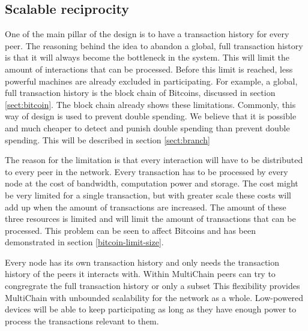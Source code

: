 \subsection{Scalable reciprocity}
\label{sect:scalable-reciprocity}
One of the main pillar of the design is to have a transaction history for every peer.
The reasoning behind the idea to abandon a global, full transaction history
is that it will always become the bottleneck in the system.
This will limit the amount of interactions that can be processed.
Before this limit is reached, less powerful machines are already excluded in participating.
For example, a global, full transaction history is the block chain of Bitcoins, discussed in section \ref{sect:bitcoin}.
The block chain already shows these limitations.
Commonly, this way of design is used to prevent double spending.
We believe that it is possible and much cheaper to detect and punish double spending than prevent double spending.
This will be described in section \ref{sect:branch}

The reason for the limitation is that every interaction will have to be distributed to every peer in the network.
Every transaction has to be processed by every node at the cost of bandwidth, computation power and storage.
The cost might be very limited for a single transaction,
but with greater scale these costs will add up when the amount of transactions are increased.
The amount of these three resources is limited and will limit the amount of transactions that can be processed.
This problem can be seen to affect Bitcoins and has been demonstrated in section \ref{bitcoin-limit-size}.

Every node has its own transaction history and only needs the transaction history of the peers it interacts with.
Within MultiChain peers can try to congregrate the full transaction history or only a subset
This flexibility provides MultiChain with unbounded scalability for the network as a whole.
Low-powered devices will be able to keep participating
as long as they have enough power to process the transactions relevant to them.
